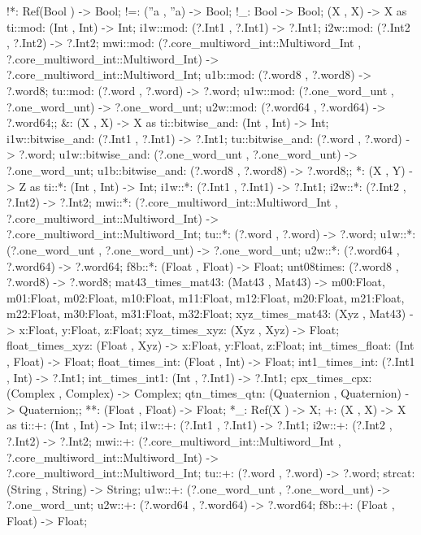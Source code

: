 !*: Ref(Bool ) -> Bool;
!=: (''a , ''a) -> Bool;
!_: Bool -> Bool;
(X , X) -> X
as  ti::mod: (Int , Int) -> Int;
    i1w::mod: (?.Int1 , ?.Int1) -> ?.Int1;
    i2w::mod: (?.Int2 , ?.Int2) -> ?.Int2;
    mwi::mod:
        (?.core_multiword_int::Multiword_Int , ?.core_multiword_int::Multiword_Int)
        ->
        ?.core_multiword_int::Multiword_Int;
    u1b::mod: (?.word8 , ?.word8) -> ?.word8;
    tu::mod: (?.word , ?.word) -> ?.word;
    u1w::mod: (?.one_word_unt , ?.one_word_unt) -> ?.one_word_unt;
    u2w::mod: (?.word64 , ?.word64) -> ?.word64;;
&:
(X , X) -> X
as  ti::bitwise_and: (Int , Int) -> Int;
    i1w::bitwise_and: (?.Int1 , ?.Int1) -> ?.Int1;
    tu::bitwise_and: (?.word , ?.word) -> ?.word;
    u1w::bitwise_and: (?.one_word_unt , ?.one_word_unt) -> ?.one_word_unt;
    u1b::bitwise_and: (?.word8 , ?.word8) -> ?.word8;;
*:
(X , Y) -> Z
as  ti::*: (Int , Int) -> Int;
    i1w::*: (?.Int1 , ?.Int1) -> ?.Int1;
    i2w::*: (?.Int2 , ?.Int2) -> ?.Int2;
    mwi::*:
        (?.core_multiword_int::Multiword_Int , ?.core_multiword_int::Multiword_Int)
        ->
        ?.core_multiword_int::Multiword_Int;
    tu::*: (?.word , ?.word) -> ?.word;
    u1w::*: (?.one_word_unt , ?.one_word_unt) -> ?.one_word_unt;
    u2w::*: (?.word64 , ?.word64) -> ?.word64;
    f8b::*: (Float , Float) -> Float;
    unt08times: (?.word8 , ?.word8) -> ?.word8;
    mat43_times_mat43:
        (Mat43 , Mat43)
        ->  {m00:Float, m01:Float, m02:Float, m10:Float, m11:Float, m12:Float, m20:Float, m21:Float, m22:Float,
            m30:Float, m31:Float, m32:Float};
    xyz_times_mat43: (Xyz , Mat43) -> {x:Float, y:Float, z:Float};
    xyz_times_xyz: (Xyz , Xyz) -> Float;
    float_times_xyz: (Float , Xyz) -> {x:Float, y:Float, z:Float};
    int_times_float: (Int , Float) -> Float;
    float_times_int: (Float , Int) -> Float;
    int1_times_int: (?.Int1 , Int) -> ?.Int1;
    int_times_int1: (Int , ?.Int1) -> ?.Int1;
    cpx_times_cpx: (Complex , Complex) -> Complex;
    qtn_times_qtn: (Quaternion , Quaternion) -> Quaternion;;
**: (Float , Float) -> Float;
*_: Ref(X ) -> X;
+:
(X , X) -> X
as  ti::+: (Int , Int) -> Int;
    i1w::+: (?.Int1 , ?.Int1) -> ?.Int1;
    i2w::+: (?.Int2 , ?.Int2) -> ?.Int2;
    mwi::+:
        (?.core_multiword_int::Multiword_Int , ?.core_multiword_int::Multiword_Int)
        ->
        ?.core_multiword_int::Multiword_Int;
    tu::+: (?.word , ?.word) -> ?.word;
    strcat: (String , String) -> String;
    u1w::+: (?.one_word_unt , ?.one_word_unt) -> ?.one_word_unt;
    u2w::+: (?.word64 , ?.word64) -> ?.word64;
    f8b::+: (Float , Float) -> Float;
